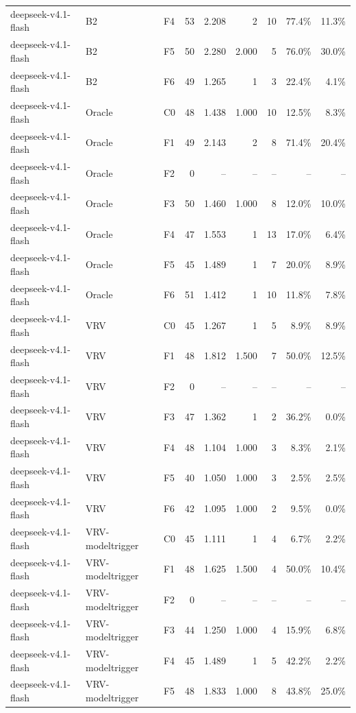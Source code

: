 \begin{tabular}{lllrrrrrr}
deepseek-v4.1-flash & B2 & F4 & 53 & 2.208 & 2 & 10 & 77.4\% & 11.3\% \\
deepseek-v4.1-flash & B2 & F5 & 50 & 2.280 & 2.000 & 5 & 76.0\% & 30.0\% \\
deepseek-v4.1-flash & B2 & F6 & 49 & 1.265 & 1 & 3 & 22.4\% & 4.1\% \\
deepseek-v4.1-flash & Oracle & C0 & 48 & 1.438 & 1.000 & 10 & 12.5\% & 8.3\% \\
deepseek-v4.1-flash & Oracle & F1 & 49 & 2.143 & 2 & 8 & 71.4\% & 20.4\% \\
deepseek-v4.1-flash & Oracle & F2 & 0 & -- & -- & -- & -- & -- \\
deepseek-v4.1-flash & Oracle & F3 & 50 & 1.460 & 1.000 & 8 & 12.0\% & 10.0\% \\
deepseek-v4.1-flash & Oracle & F4 & 47 & 1.553 & 1 & 13 & 17.0\% & 6.4\% \\
deepseek-v4.1-flash & Oracle & F5 & 45 & 1.489 & 1 & 7 & 20.0\% & 8.9\% \\
deepseek-v4.1-flash & Oracle & F6 & 51 & 1.412 & 1 & 10 & 11.8\% & 7.8\% \\
deepseek-v4.1-flash & VRV & C0 & 45 & 1.267 & 1 & 5 & 8.9\% & 8.9\% \\
deepseek-v4.1-flash & VRV & F1 & 48 & 1.812 & 1.500 & 7 & 50.0\% & 12.5\% \\
deepseek-v4.1-flash & VRV & F2 & 0 & -- & -- & -- & -- & -- \\
deepseek-v4.1-flash & VRV & F3 & 47 & 1.362 & 1 & 2 & 36.2\% & 0.0\% \\
deepseek-v4.1-flash & VRV & F4 & 48 & 1.104 & 1.000 & 3 & 8.3\% & 2.1\% \\
deepseek-v4.1-flash & VRV & F5 & 40 & 1.050 & 1.000 & 3 & 2.5\% & 2.5\% \\
deepseek-v4.1-flash & VRV & F6 & 42 & 1.095 & 1.000 & 2 & 9.5\% & 0.0\% \\
deepseek-v4.1-flash & VRV-modeltrigger & C0 & 45 & 1.111 & 1 & 4 & 6.7\% & 2.2\% \\
deepseek-v4.1-flash & VRV-modeltrigger & F1 & 48 & 1.625 & 1.500 & 4 & 50.0\% & 10.4\% \\
deepseek-v4.1-flash & VRV-modeltrigger & F2 & 0 & -- & -- & -- & -- & -- \\
deepseek-v4.1-flash & VRV-modeltrigger & F3 & 44 & 1.250 & 1.000 & 4 & 15.9\% & 6.8\% \\
deepseek-v4.1-flash & VRV-modeltrigger & F4 & 45 & 1.489 & 1 & 5 & 42.2\% & 2.2\% \\
deepseek-v4.1-flash & VRV-modeltrigger & F5 & 48 & 1.833 & 1.000 & 8 & 43.8\% & 25.0\% \\

\end{tabular}
